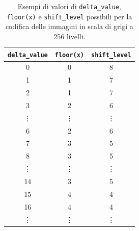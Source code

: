 \documentclass{article}
\begin{document}
\begin{itemize}
            \vspace{0,2cm}
            \begin{table}[h]
                \centering
                \small
                \def\arraystretch{1.3} %
                \caption{Esempi di valori di \texttt{delta\_value}, \texttt{floor(x)} e \texttt{shift\_level} possibili per la codifica delle immagini in scala di grigi a 256 livelli.}
                \begin{tabular}{||c|c|c||}
                    \hline
                    \texttt{delta\_value} & \texttt{floor(x)\footnotemark} & \texttt{shift\_level} \\
                    \hline \hline
                    0                     & 0                              & 8                     \\\hline
                    1                     & 1                              & 7                     \\\hline
                    2                     & 1                              & 7                     \\\hline
                    3                     & 2                              & 6                     \\\hline
                    \vdots                & \vdots                         & \vdots                \\\hline
                    6                     & 2                              & 6                     \\\hline
                    7                     & 3                              & 5                     \\\hline
                    8                     & 3                              & 5                     \\\hline
                    \vdots                & \vdots                         & \vdots                \\\hline
                    14                    & 3                              & 5                     \\\hline
                    15                    & 4                              & 4                     \\\hline
                    16                    & 4                              & 4                     \\\hline
                    \vdots                & \vdots                         & \vdots                \\\hline

\end{tabular}
\end{table}
\end{itemize}
\end{document}
